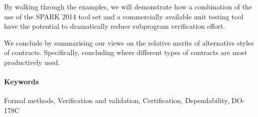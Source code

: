 \documentclass{llncs}
\begin{document}
By walking through the examples, we will demonstrate how a combination
of the use of the SPARK 2014 tool set and a commercially available unit 
testing tool have the potential to dramatically reduce subprogram 
verification effort.

We conclude by summarising our views on the relative merits of
alternative styles of contracts. Specifically, concluding where
different types of contracts are most productively used. 


\paragraph{Keywords}
Formal methods, Verification and validation, Certification,
Dependability, DO-178C




\end{document}
